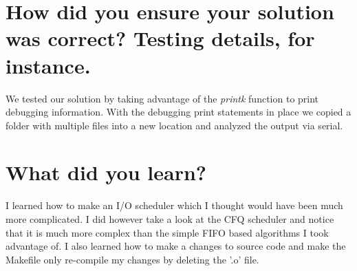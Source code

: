 \documentclass[letterpaper,10pt,notitlepage,fleqn]{article}
\begin{document}
\section*{How did you ensure your solution was correct? Testing details, for instance.}
We tested our solution by taking advantage of the \textit{printk} function to print debugging 
information. With the debugging print statements in place we copied a folder with multiple files 
into a new location and analyzed the output via serial. 
\section*{What did you learn?}
I learned how to make an I/O scheduler which I thought would have been much more complicated. I did however take a look at the CFQ scheduler and notice that it is much more complex than the simple FIFO based algorithms I took advantage of. I also learned how to make a changes to source code and make the Makefile only re-compile my changes by deleting the '.o' file.
\end{document}
